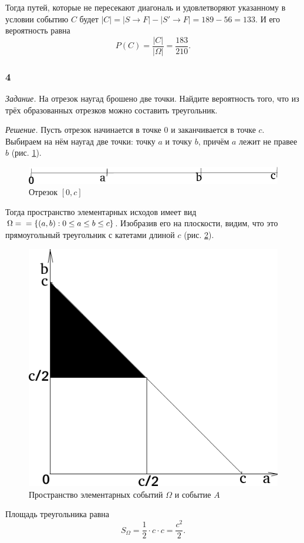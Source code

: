 Тогда путей,
которые не пересекают диагональ и удовлетворяют указанному в условии событию $C$ будет
$ \left| C \right| =
\left| S \rightarrow F \right| - \left| S' \rightarrow F \right| =
189 - 56 =
133$.
И его вероятность равна
$$P \left( C \right) =
\frac{ \left| C \right| }{ \left| \Omega \right| } =
\frac{183}{210}.$$

\subsubsection*{4}

\textit{Задание.} На отрезок наугад брошено две точки.
Найдите вероятность того, что из трёх образованных отрезков можно составить треугольник.

\textit{Решение.} Пусть отрезок начинается в точке 0 и заканчивается в точке $c$.
Выбираем на нём наугад две точки: точку $a$ и точку $b$, причём $a$ лежит не правее $b$ (рис. \ref{fig:24}).

\begin{figure}[h!]
  \centering
  \includegraphics[width=.4\textwidth]{./pictures/t1v2_4.png}
  \caption{Отрезок $ \left[ 0, c \right] $}
  \label{fig:24}
\end{figure}

Тогда пространство элементарных исходов имеет вид $ \Omega =  \\
= \left\{ \left( a, b \right): 0 \leq a \leq b \leq c \right\} $.
Изобразив его на плоскости, видим, что это прямоугольный треугольник с катетами длиной $c$ (рис. \ref{fig:241}).

\begin{figure}[h!]
  \centering
  \includegraphics[width=.4\textwidth]{./pictures/t1v2_41.png}
  \caption{Пространство элементарных событий $ \Omega$ и событие $A$}
  \label{fig:241}
\end{figure}

Площадь треугольника равна
$$S_{ \Omega } =
\frac{1}{2} \cdot c \cdot c =
\frac{c^2}{2}.$$

